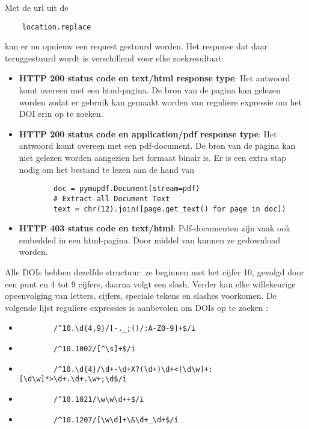 Met de url uit de \begin{verbatim}
    location.replace
\end{verbatim}
kan er nu opnieuw een request gestuurd worden.
Het response dat daar teruggestuurd wordt is verschillend voor elke zoekresultaat:
\begin{itemize}
    \item \textbf{HTTP 200 status code en text/html response type}: Het antwoord komt overeen met een html-pagina. De bron van de pagina kan gelezen worden zodat er gebruik kan gemaakt worden van reguliere expressie om het DOI erin op te zoeken.
    \item \textbf{HTTP 200 status code en application/pdf response type}: Het antwoord komt overeen met een pdf-document. De bron van de pagina kan niet gelezen worden aangezien het formaat binair is. Er is een extra stap nodig om het bestand te lezen aan de hand van \autocite{Pymupdf2025}
    \begin{lstlisting}
        doc = pymupdf.Document(stream=pdf)
        # Extract all Document Text
        text = chr(12).join([page.get_text() for page in doc])
    \end{lstlisting}
    \item \textbf{HTTP 403 status code en text/html}: Pdf-documenten zijn vaak ook embedded in een html-pagina. Door middel van \autocite{Selenium2025} kunnen ze gedownload worden.
\end{itemize}
Alle DOIs hebben dezelfde structuur: ze beginnen met het cijfer 10, gevolgd door een punt en 4 tot 9 cijfers, daarna volgt een slash. Verder kan elke willekeurige opeenvolging van letters, cijfers, speciale tekens en slashes voorkomen.
De volgende lijst reguliere expressies is aanbevolen om DOIs op te zoeken \textcite{CrossrefRegex2025}:
\begin{itemize}
    \item \begin{verbatim}
        /^10.\d{4,9}/[-._;()/:A-Z0-9]+$/i
    \end{verbatim}
    \item \begin{verbatim}
        /^10.1002/[^\s]+$/i
    \end{verbatim}
    \item \begin{verbatim}
        /^10.\d{4}/\d+-\d+X?(\d+)\d+<[\d\w]+:[\d\w]*>\d+.\d+.\w+;\d$/i
    \end{verbatim}
    \item \begin{verbatim}
        /^10.1021/\w\w\d++$/i
    \end{verbatim}
    \item \begin{verbatim}
        /^10.1207/[\w\d]+\&\d+_\d+$/i
    \end{verbatim}
\end{itemize}

